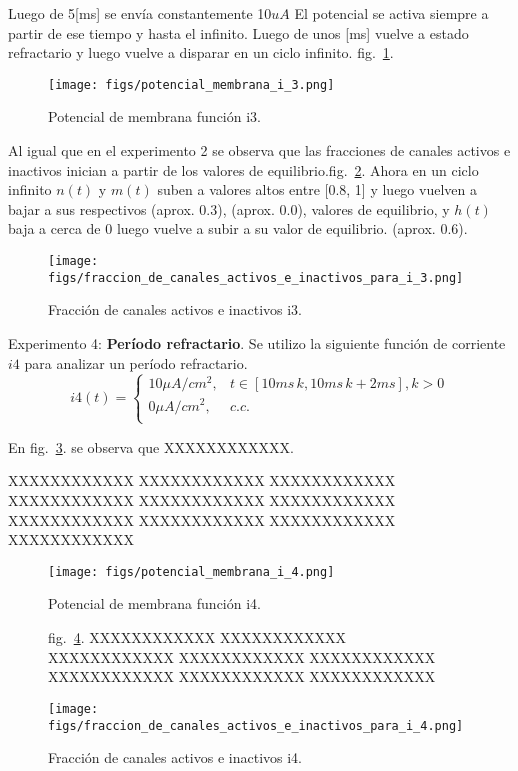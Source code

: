 \documentclass[aps,prl,twocolumn,groupedaddress]{revtex4-2}
\begin{document}
Luego de 5[ms] se envía constantemente 10$uA$
El potencial se activa siempre a partir de ese tiempo y hasta el infinito.
Luego de unos [ms] vuelve a estado refractario y luego vuelve a disparar en un ciclo infinito. fig.~\ref{fig5}.



\begin{figure}[h!]
\centering
\texttt{[image: figs/potencial\_membrana\_i\_3.png]}
\caption{Potencial de membrana función i3. \label{fig5}}
\end{figure}

Al igual que en el experimento 2 se observa que las fracciones de canales activos e inactivos inician a partir de los valores de equilibrio.fig.~\ref{fig6}.
Ahora en un ciclo infinito $n(t)$ y $m(t)$ suben a valores altos entre
[0.8, 1] y luego vuelven a bajar a sus respectivos (aprox. 0.3), (aprox. 0.0), valores de equilibrio, 
y $h(t)$ baja a cerca de 0   luego vuelve a subir a su valor de equilibrio. (aprox. 0.6).



\begin{figure}[h!]
\centering
\texttt{[image: figs/fraccion\_de\_canales\_activos\_e\_inactivos\_para\_i\_3.png]}
\caption{Fracción de canales activos e inactivos i3. \label{fig6}}
\end{figure}


Experimento 4: \textbf{Período refractario}. Se utilizo la siguiente función de corriente $i4$ para analizar un período refractario.
$$
i4(t) = \left\{
\begin{array}{ll}
10 \mu A/cm^2, & t\in [10ms\, k,10 ms\, k + 2ms], k > 0\\
0 \mu A/cm^2, & c.c. \\
\end{array}
\right.
$$

En fig.~\ref{fig7}. se observa  que 
XXXXXXXXXXXX.  

XXXXXXXXXXXX
XXXXXXXXXXXX
XXXXXXXXXXXX
XXXXXXXXXXXX
XXXXXXXXXXXX
XXXXXXXXXXXX
XXXXXXXXXXXX
XXXXXXXXXXXX
XXXXXXXXXXXX
XXXXXXXXXXXX


\begin{figure}[h!]
\centering
\texttt{[image: figs/potencial\_membrana\_i\_4.png]}
\caption{Potencial de membrana función i4.\label{fig7}}
\end{figure}
\begin{figure}[h!]

fig.~\ref{fig8}.
XXXXXXXXXXXX
XXXXXXXXXXXX
XXXXXXXXXXXX
XXXXXXXXXXXX
XXXXXXXXXXXX
XXXXXXXXXXXX
XXXXXXXXXXXX
XXXXXXXXXXXX


\centering
\texttt{[image: figs/fraccion\_de\_canales\_activos\_e\_inactivos\_para\_i\_4.png]}
\caption{Fracción de canales activos e inactivos i4. \label{fig8}}
\end{figure}
\end{document}
